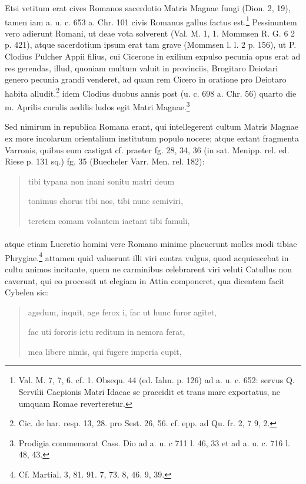 \documentclass[a4paper, 11pt, oneside, polutonikogreek, german, twocolumn]{article}
\begin{document}
Etsi vetitum erat cives Romanos sacerdotio Matris Magnae fungi (Dion. 2, 19), tamen iam a. u. c. 653 a. Chr. 101 civis Romanus gallus factus est.\footnote{Val. M. 7, 7, 6. cf. 1. Obsequ. 44 (ed. Iahn. p. 126) ad a. u. c. 652: servus Q. Servilii Caepionis Matri Idaeae se praecidit et trans mare exportatus, ne umquam Romae reverteretur.} Pessinuntem vero adierunt Romani, ut deae vota solverent (Val. M. 1, 1. Mommsen R. G. 6 2 p. 421), atque sacerdotium ipsum erat tam grave (Mommsen l. l. 2 p. 156), ut P. Clodius Pulcher Appii filius, cui Cicerone in exilium expulso pecunia opus erat ad res gerendas, illud, quoniam multum valuit in provinciis, Brogitaro Deiotari genero pecunia grandi venderet, ad quam rem Cicero in oratione pro Deiotaro habita alludit.\footnote{Cic. de har. resp. 13, 28. pro Sest. 26, 56. cf. epp. ad Qu. fr. 2, 7 9, 2.} idem Clodius duobus annis post (u. c. 698 a. Chr. 56) quarto die m. Aprilis curulis aedilis ludos egit Matri Magnae.\footnote{Prodigia commemorat Cass. Dio ad a. u. c 711 l. 46, 33 et ad a. u. c. 716 l. 48, 43.}

Sed nimirum in republica Romana erant, qui intellegerent cultum Matris Magnae ex more incolarum orientalium institutum populo nocere; atque extant fragmenta Varronis, quibus eum castigat cf. praeter fg. 28, 34, 36 (in sat. Menipp. rel. ed. Riese p. 131 sq.) fg. 35 (Buecheler Varr. Men. rel. 182):
\begin{quotation}
tibi typana non inani sonitu matri deum

tonimus chorus tibi nos, tibi nunc semiviri,

teretem comam volantem iactant tibi famuli,
\end{quotation}
\paragraph{}
atque etiam Lucretio homini vere Romano minime placuerunt molles modi tibiae Phrygiae.\footnote{Cf. Martial. 3, 81. 91. 7, 73. 8, 46. 9, 39.} attamen quid valuerunt illi viri contra vulgus, quod acquiescebat in cultu animos incitante, quem ne carminibus celebrarent viri veluti Catullus non caverunt, qui eo processit ut elegiam in Attin componeret, qua dicentem facit Cybelen sic:
\begin{quotation}
agedum, inquit, age ferox i, fac ut hunc furor agitet,

fac uti fororis ictu reditum in nemora ferat,

mea libere nimis, qui fugere imperia cupit,
\end{quotation}
\end{document}
